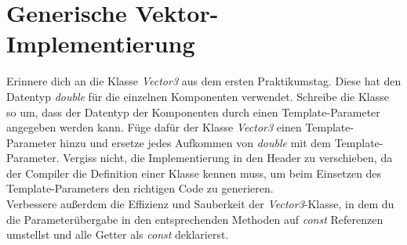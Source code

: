 \section{Generische Vektor-Implementierung}
Erinnere dich an die Klasse \emph{Vector3} aus dem ersten Praktikumstag. Diese hat den Datentyp \emph{double} für die einzelnen Komponenten verwendet. Schreibe die Klasse so um, dass der Datentyp der Komponenten durch einen Template-Parameter angegeben werden kann.
Füge dafür der Klasse \emph{Vector3} einen Template-Parameter hinzu und ersetze jedes Aufkommen von \emph{double} mit dem Template-Parameter.
Vergiss nicht, die Implementierung in den Header zu verschieben, da der Compiler die Definition einer Klasse kennen muss, um beim Einsetzen des Template-Parameters den richtigen Code zu generieren.\\

Verbessere außerdem die Effizienz und Sauberkeit der \emph{Vector3}-Klasse, in dem du die Parameterübergabe in den entsprechenden Methoden auf \emph{const} Referenzen umstellst und alle Getter als \emph{const} deklarierst. 



